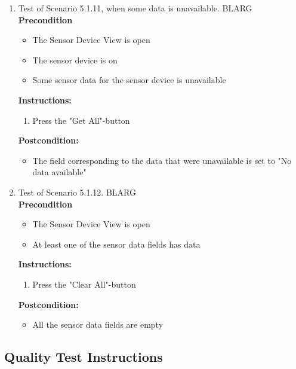 \documentclass[a4paper]{article}
\newlength{\testlabellength}
\newenvironment{testlist}{\begin{enumerate}[label=\bfseries Instruction \thesubsection.\arabic* , labelindent=0pt, labelwidth=\testlabellength , leftmargin=2cm]}{\end{enumerate}}
\newenvironment{precondition}{
{\color{white}BLARG}\\ 
\textbf{Precondition}
\begin{itemize}[labelindent=0cm, labelwidth=2cm , leftmargin=1cm]
}
{\end{itemize}}
\newenvironment{instruction}{
\textbf{Instructions:}
\begin{enumerate}[label=\bfseries  \arabic*., labelindent=0cm, labelwidth=2cm , leftmargin=1cm]
}
{\end{enumerate}}
\newenvironment{postcondition}{
\textbf{Postcondition:}
\begin{itemize}[labelindent=0cm, labelwidth=2cm , leftmargin=1cm]
}
{\end{itemize}}
\begin{document}
\begin{appendices}
\begin{testlist}
	\item  Test of Scenario 5.1.11, when some data is unavailable.
		\begin{precondition}
			\item The Sensor Device View is open
			\item The sensor device is on
    	    \item Some sensor data for the sensor device is unavailable
		\end{precondition}
		\begin{instruction}
			\item Press the "Get All"-button
		\end{instruction}
		\begin{postcondition} 
			\item The field corresponding to the data that were unavailable is set to "No data available"
		\end{postcondition}

	\item Test of Scenario 5.1.12.
		\begin{precondition} 
			\item The Sensor Device View is open
			\item At least one of the sensor data fields has data
		\end{precondition}
		\begin{instruction} 
			\item Press the "Clear All"-button
		\end{instruction}
	  	\begin{postcondition}
			\item All the sensor data fields are empty
		\end{postcondition}

\end{testlist}
\newpage
\subsection{Quality Test Instructions}

\begin{testlist}


\end{testlist}
\end{appendices}
\end{document}
